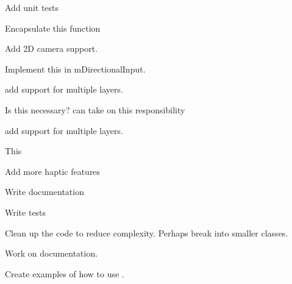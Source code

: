 \begin{DoxyRefList}
Add unit tests 
\item[Member \doxylink{class_atlas_1_1_file_system_registry_a09591b2eeacb6c7b5aa460780be9a26f}{Atlas\+::File\+System\+Registry\+::init} (const char \texorpdfstring{$\ast$}{*}root\+Path)]\label{todo__todo000008}%
%
Encapsulate this function  
\item[Class \doxylink{class_atlas_1_1_game_camera}{Atlas\+::Game\+Camera} ]\label{todo__todo000016}%
%
Add 2D camera support.  
\item[Class \doxylink{class_atlas_1_1_game_camera_1_1_directional_input}{Atlas\+::Game\+Camera\+::Directional\+Input} ]\label{todo__todo000017}%
%
Implement this in m\+Directional\+Input.  
\item[Class \doxylink{class_atlas_1_1_i_game_object}{Atlas\+::IGame\+Object} ]\label{todo__todo000011}%
%
add support for multiple layers. 
\item[Member \doxylink{class_atlas_1_1_i_game_object_aadb8ac4a4ee34905fb156c41929f24f6}{Atlas\+::IGame\+Object\+::cleanup} ()=0]\label{todo__todo000013}%
%
Is this necessary?  can take on this responsibility 
\item[Member \doxylink{class_atlas_1_1_i_game_object_a0001128436e3b2402a682785f7fd8463}{Atlas\+::IGame\+Object\+::depth} ]\label{todo__todo000012}%
%
add support for multiple layers.  
\item[Class \doxylink{class_atlas_1_1_localization_registry}{Atlas\+::Localization\+Registry} ]\label{todo__todo000010}%
%
This  
\item[\doxylink{class_atlas_1_1_file}{File} \doxylink{_common_8h}{Common.h} ]\label{todo__todo000002}%
%
Add more haptic features 
\item[\doxylink{class_atlas_1_1_file}{File} \doxylink{_file_system_registry_8h}{File\+System\+Registry.h} ]\label{todo__todo000005}%
%
Write documentation 



Write tests 



Clean up the code to reduce complexity. Perhaps break into smaller classes.  
\item[\doxylink{class_atlas_1_1_file}{File} \doxylink{_game_camera_8h}{Game\+Camera.h} ]\label{todo__todo000015}%
%
Work on documentation.  
\item[\doxylink{class_atlas_1_1_file}{File} \doxylink{_input_8h}{Input.h} ]\label{todo__todo000009}%
%
Create examples of how to use . 




\end{DoxyRefList}
